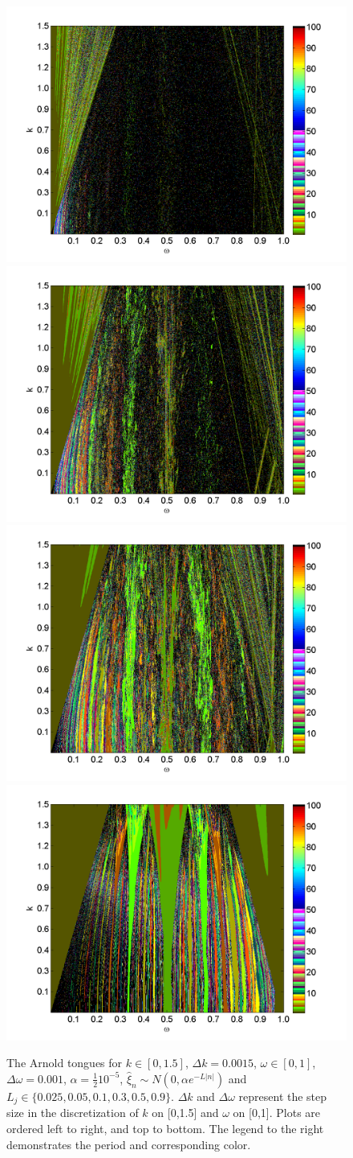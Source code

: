 \begin{figure}[H]\linespread{1}  
\caption[The Arnold tongues for the random circle map, normal
distribution, $\alpha = \frac{1}{2}10^{-5}$]{The Arnold
  tongues for $k\in [0,1.5]$, $\Delta k = 0.0015$, $\omega \in [0,1]$,
  $\Delta \omega = 0.001$, $\alpha = \frac{1}{2}10^{-5}$, $\hat{\xi}_n\sim
  N(0,\alpha e^{-L|n|})$ and $L_j \in
  \{0.025,0.05,0.1,0.3,0.5,0.9\}$. $\Delta k$ and $\Delta \omega$
  represent the step size in the discretization of $k$ on [0,1.5] and $\omega$
  on [0,1]. Plots are ordered left to right, and top to bottom. The legend
to the right demonstrates the period and corresponding color.}\label{fig:rcirctongues_n_ha}
\centering
\includegraphics[width=.5\textwidth]{figs/tongues_norm_halfa_1000_L_0025.png}\hfill
\includegraphics[width=.5\textwidth]{figs/tongues_norm_halfa_1000_L_005.png}\\
\includegraphics[width=.5\textwidth]{figs/tongues_norm_halfa_1000_L_01.png}\hfill
\includegraphics[width=.5\textwidth]{figs/tongues_norm_halfa_1000_L_03.png}\\

\end{figure}
